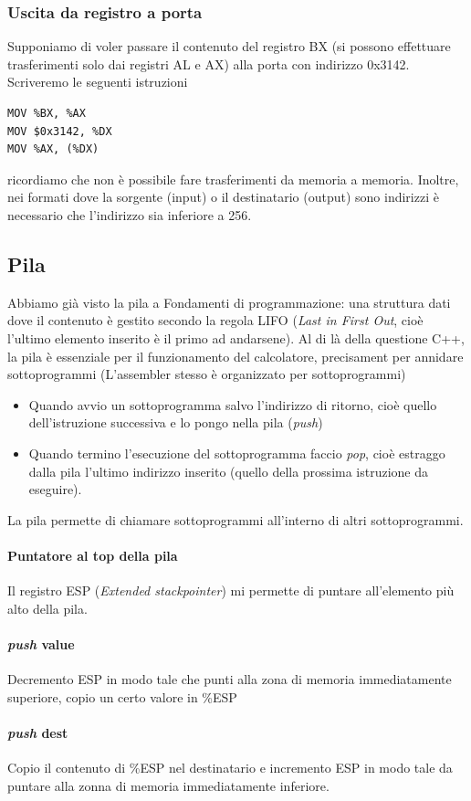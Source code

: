 \documentclass[11pt]{report}
\begin{document}
\subsubsection{Uscita da registro a porta}
Supponiamo di voler passare il contenuto del registro BX (si possono effettuare trasferimenti solo dai registri AL e AX) alla porta con indirizzo 0x3142. Scriveremo le seguenti istruzioni
\begin{verbatim}
MOV %BX, %AX
MOV $0x3142, %DX
MOV %AX, (%DX)
\end{verbatim}
ricordiamo che non è possibile fare trasferimenti da memoria a memoria. Inoltre, nei formati dove la sorgente (input) o il destinatario (output) sono indirizzi è necessario che l'indirizzo sia inferiore a 256.

\subsection{Pila}
Abbiamo già visto la pila a Fondamenti di programmazione: una struttura dati dove il contenuto è gestito secondo la regola LIFO (\emph{Last in First Out}, cioè l'ultimo elemento inserito è il primo ad andarsene). Al di là della questione C++, la pila è essenziale per il funzionamento del calcolatore, precisament per annidare sottoprogrammi (L'assembler stesso è organizzato per sottoprogrammi)
\begin{itemize}
\item Quando avvio un sottoprogramma salvo l'indirizzo di ritorno, cioè quello dell'istruzione successiva e lo pongo nella pila (\emph{push})
\item Quando termino l'esecuzione del sottoprogramma faccio \emph{pop}, cioè estraggo dalla pila l'ultimo indirizzo inserito (quello della prossima istruzione da eseguire).
\end{itemize}
La pila permette di chiamare sottoprogrammi all'interno di altri sottoprogrammi.
\paragraph{Puntatore al top della pila} Il registro ESP (\emph{Extended stackpointer}) mi permette di puntare all'elemento più alto della pila. 
\paragraph{\emph{push} value} Decremento ESP in modo tale che punti alla zona di memoria immediatamente superiore, copio un certo valore in \%ESP
\paragraph{\emph{push} dest} Copio il contenuto di \%ESP nel destinatario e incremento ESP in modo tale da puntare alla zonna di memoria immediatamente inferiore.
\end{document}
